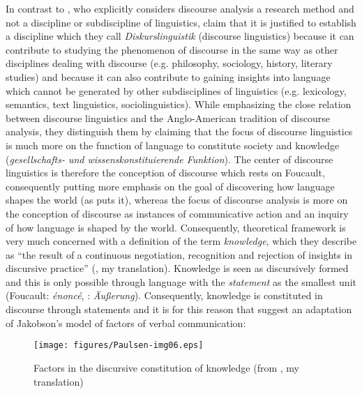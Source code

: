 In contrast to \citet{Johnstone2018}, who explicitly considers discourse analysis a research method and not a discipline or subdiscipline of linguistics, \citet[2]{Spitzmuller2011} claim that it is justified to establish a discipline which they call \emph{Diskurslinguistik} (discourse linguistics) because it can contribute to studying the phenomenon of discourse in the same way as other disciplines dealing with discourse (e.g. philosophy, sociology, history, literary studies) and because it can also contribute to gaining insights into language which cannot be generated by other subdisciplines of linguistics (e.g. lexicology, semantics, text linguistics, sociolinguistics). While emphasizing the close relation between discourse linguistics and the Anglo-American tradition of discourse analysis, they distinguish them by claiming that the focus of discourse linguistics is much more on the function of language to constitute society and knowledge (\textit{gesellschafts- und wissenskonstituierende Funktion}). The center of discourse linguistics is therefore the conception of discourse which rests on Foucault, consequently putting more emphasis on the goal of discovering how language shapes the world (as \citealt{Johnstone2018} puts it), whereas the focus of discourse analysis is more on the conception of discourse as instances of communicative action and an inquiry of how language is shaped by the world. Consequently,  theoretical framework is very much concerned with a definition of the term \textit{knowledge}, which they describe as “the result of a continuous negotiation, recognition and rejection of insights in discursive practice” (\citeyear[42]{Spitzmuller2011}, my translation). Knowledge is seen as discursively formed and this is only possible through language with the \textit{statement} as the smallest unit (Foucault: \emph{énoncé}, \citeauthor{Spitzmuller2011}: \emph{Äußerung}). Consequently, knowledge is constituted in discourse through statements and it is for this reason that \citet{Spitzmuller2011} suggest an adaptation of Jakobson’s model of factors of verbal communication:


\begin{figure}
\texttt{[image: figures/Paulsen-img06.eps]}
\caption{Factors in the discursive constitution of knowledge (from \citealt[54]{Spitzmuller2011}, my translation)
}
\label{fig:2:6}
\end{figure}

